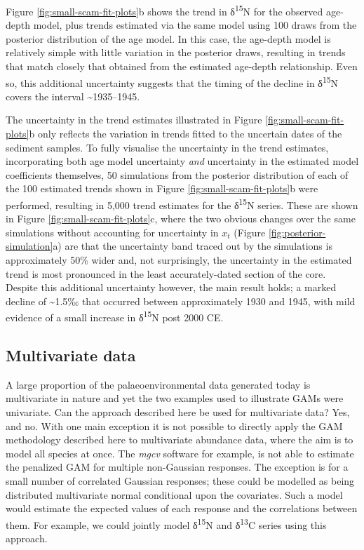 \documentclass[12pt,]{article}
\begin{document}
Figure \ref{fig:small-scam-fit-plots}b shows the trend in
δ\textsuperscript{15}N for the observed age-depth model, plus trends
estimated via the same model using 100 draws from the posterior
distribution of the age model. In this case, the age-depth model is
relatively simple with little variation in the posterior draws,
resulting in trends that match closely that obtained from the estimated
age-depth relationship. Even so, this additional uncertainty suggests
that the timing of the decline in δ\textsuperscript{15}N covers the
interval \textasciitilde{}1935--1945.

The uncertainty in the trend estimates illustrated in Figure
\ref{fig:small-scam-fit-plots}b only reflects the variation in trends
fitted to the uncertain dates of the sediment samples. To fully
visualise the uncertainty in the trend estimates, incorporating both age
model uncertainty \emph{and} uncertainty in the estimated model
coefficients themselves, 50 simulations from the posterior distribution
of each of the 100 estimated trends shown in Figure
\ref{fig:small-scam-fit-plots}b were performed, resulting in 5,000 trend
estimates for the δ\textsuperscript{15}N series. These are shown in
Figure \ref{fig:small-scam-fit-plots}c, where the two obvious changes
over the same simulations without accounting for uncertainty in \(x_t\)
(Figure \ref{fig:posterior-simulation}a) are that the uncertainty band
traced out by the simulations is approximately 50\% wider and, not
surprisingly, the uncertainty in the estimated trend is most pronounced
in the least accurately-dated section of the core. Despite this
additional uncertainty however, the main result holds; a marked decline
of \textasciitilde{}1.5‰ that occurred between approximately 1930 and
1945, with mild evidence of a small increase in δ\textsuperscript{15}N
post 2000 CE.

\subsection{Multivariate data}\label{multivariate-data}

A large proportion of the palaeoenvironmental data generated today is
multivariate in nature and yet the two examples used to illustrate GAMs
were univariate. Can the approach described here be used for
multivariate data? Yes, and no. With one main exception it is not
possible to directly apply the GAM methodology described here to
multivariate abundance data, where the aim is to model all species at
once. The \emph{mgcv} software for example, is not able to estimate the
penalized GAM for multiple non-Gaussian responses. The exception is for
a small number of correlated Gaussian responses; these could be modelled
as being distributed multivariate normal conditional upon the
covariates. Such a model would estimate the expected values of each
response and the correlations between them. For example, we could
jointly model δ\textsuperscript{15}N and δ\textsuperscript{13}C series
using this approach.
\end{document}
